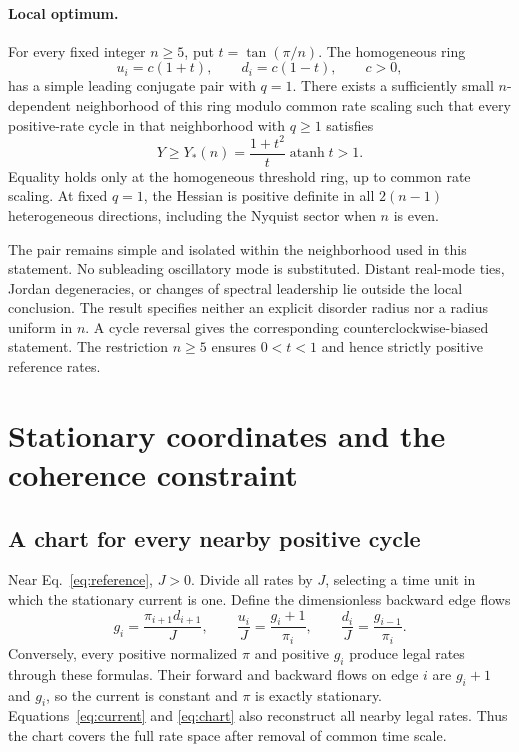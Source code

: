 \documentclass[aps,pre,onecolumn,11pt,notitlepage,nofootinbib]{revtex4-2}
\newcommand{\atanh}{\operatorname{atanh}}
\begin{document}
\paragraph*{Local optimum.}
For every fixed integer $n\geq5$, put $t=\tan(\pi/n)$. The homogeneous ring
\begin{equation}
 u_i=c(1+t),\qquad d_i=c(1-t),\qquad c>0,
 \label{eq:reference}
\end{equation}
has a simple leading conjugate pair with $q=1$. There exists a sufficiently small $n$-dependent neighborhood of this ring modulo common rate scaling such that every positive-rate cycle in that neighborhood with $q\geq1$ satisfies
\begin{equation}
 Y\geq Y_*(n)=\frac{1+t^2}{t}\atanh t>1.
 \label{eq:main}
\end{equation}
Equality holds only at the homogeneous threshold ring, up to common rate scaling. At fixed $q=1$, the Hessian is positive definite in all $2(n-1)$ heterogeneous directions, including the Nyquist sector when $n$ is even.

The pair remains simple and isolated within the neighborhood used in this statement. No subleading oscillatory mode is substituted. Distant real-mode ties, Jordan degeneracies, or changes of spectral leadership lie outside the local conclusion. The result specifies neither an explicit disorder radius nor a radius uniform in $n$. A cycle reversal gives the corresponding counterclockwise-biased statement. The restriction $n\geq5$ ensures $0<t<1$ and hence strictly positive reference rates.

\section{Stationary coordinates and the coherence constraint}
\subsection{A chart for every nearby positive cycle}
Near Eq.~\eqref{eq:reference}, $J>0$. Divide all rates by $J$, selecting a time unit in which the stationary current is one. Define the dimensionless backward edge flows
\begin{equation}
 g_i=\frac{\pi_{i+1}d_{i+1}}{J},\qquad
 \frac{u_i}{J}=\frac{g_i+1}{\pi_i},\qquad
 \frac{d_i}{J}=\frac{g_{i-1}}{\pi_i}.
 \label{eq:chart}
\end{equation}
Conversely, every positive normalized $\pi$ and positive $g_i$ produce legal rates through these formulas. Their forward and backward flows on edge $i$ are $g_i+1$ and $g_i$, so the current is constant and $\pi$ is exactly stationary. Equations~\eqref{eq:current} and \eqref{eq:chart} also reconstruct all nearby legal rates. Thus the chart covers the full rate space after removal of common time scale.
\end{document}
